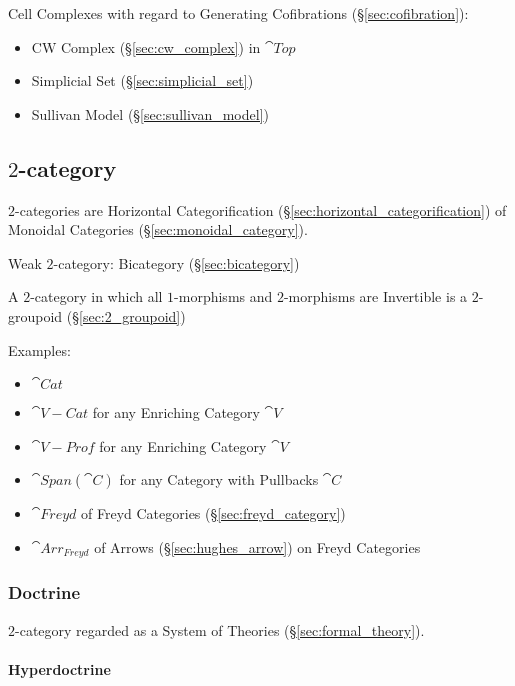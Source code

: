 Cell Complexes with regard to Generating Cofibrations
(\S\ref{sec:cofibration}):
\begin{itemize}
\item CW Complex (\S\ref{sec:cw_complex}) in $\cat{Top}$
\item Simplicial Set (\S\ref{sec:simplicial_set})
\item Sullivan Model (\S\ref{sec:sullivan_model})
\end{itemize}



\subsection{$2$-category}\label{sec:2_category}

$2$-categories are Horizontal Categorification
(\S\ref{sec:horizontal_categorification}) of Monoidal Categories
(\S\ref{sec:monoidal_category}).

Weak $2$-category: Bicategory (\S\ref{sec:bicategory})

A $2$-category in which all $1$-morphisms and $2$-morphisms are
Invertible is a $2$-groupoid (\S\ref{sec:2_groupoid})

Examples:
\begin{itemize}
\item $\cat{Cat}$
\item $\cat{V-Cat}$ for any Enriching Category $\cat{V}$
\item $\cat{V-Prof}$ for any Enriching Category $\cat{V}$
\item $\cat{Span}(\cat{C})$ for any Category with Pullbacks $\cat{C}$
\item $\cat{Freyd}$ of Freyd Categories (\S\ref{sec:freyd_category})
\item $\cat{Arr_{Freyd}}$ of Arrows (\S\ref{sec:hughes_arrow}) on
  Freyd Categories
\end{itemize}



\subsubsection{Doctrine}\label{sec:doctrine}

$2$-category regarded as a System of Theories
(\S\ref{sec:formal_theory}).



\paragraph{Hyperdoctrine}\label{sec:hyperdoctrine}
\hfill \\


